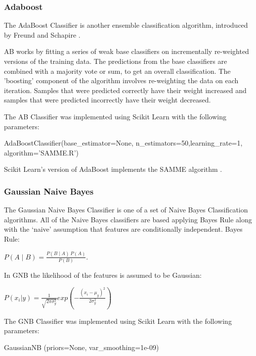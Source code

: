 \subsubsection*{Adaboost}

The AdaBoost Classifier is another ensemble classification algorithm, introduced by Freund and Schapire \cite{adaboost1997}.

AB works by fitting a series of weak base classifiers on incrementally re-weighted versions of the training data. The predictions from the base classifiers are combined with a majority vote or sum, to get an overall classification. The 'boosting' component of the algorithm involves re-weighting the data on each iteration. Samples that were predicted correctly have their weight increased and samples that were predicted incorrectly have their weight decreased.

The AB Classifier was implemented using Scikit Learn with the following parameters:

\begin{tcolorbox}
\begin{center}
	AdaBoostClassifier(base\_estimator=None, n\_estimators=50,learning\_rate=1, algorithm=’SAMME.R’)
\end{center}
\end{tcolorbox}

Scikit Learn's version of AdaBoost implements the SAMME algorithm \cite{multiclassada2009}.

\subsubsection*{Gaussian Naive Bayes}

The Gaussian Naive Bayes Classifier is one of a set of Naive Bayes Classification algorithms. All of the Naive Bayes classifiers are based applying Bayes Rule along with the ‘naive’ assumption that features are conditionally independent. Bayes Rule: 
\begin{center}
\(P(A\mid B)=\frac{P(B\mid A)\:P(A)}{P(B)}\). 
\end{center}
In GNB the likelihood of the features is assumed to be Gaussian:
\begin{center}
$P(x_i|y) = \frac{1}{\sqrt{2\pi\sigma_y^2}} exp (- \frac{(x_i - \mu_y)^2}{2\sigma_y^2})$
\end{center}
The GNB Classifier was implemented using Scikit Learn with the following parameters:

\begin{tcolorbox}
\begin{center}
	GaussianNB (priors=None, var\_smoothing=1e-09)
\end{center}
\end{tcolorbox}


